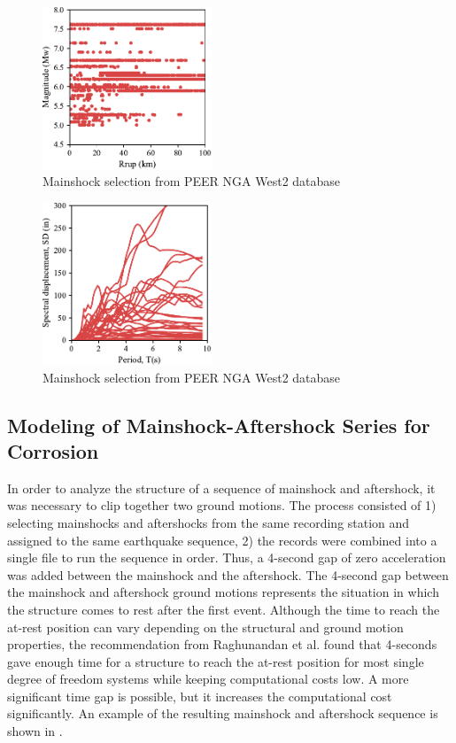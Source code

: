\begin{figure}[htbp]
	\centering
	\includegraphics[width=0.45\textwidth]{Chapter-5/figs/GM_Selection.pdf}
	\caption{Mainshock selection from PEER NGA West2 database}
	\label{fig:GM_Selection}
\end{figure}

\begin{figure}[htbp]
	\centering
	\includegraphics[width=0.45\textwidth]{Chapter-5/figs/SD_Spectrum_GM_Selection.pdf}
	\caption{Mainshock selection from PEER NGA West2 database}
	\label{fig:DisplacementSpectrum_Selection}
\end{figure}

\subsection{Modeling of Mainshock-Aftershock Series for Corrosion}

In order to analyze the structure of a sequence of mainshock and aftershock, it was necessary to clip together two ground motions. The process consisted of 1) selecting mainshocks and aftershocks from the same recording station and assigned to the same earthquake sequence, 2) the records were combined into a single file to run the sequence in order. Thus, a 4-second gap of zero acceleration was added between the mainshock and the aftershock. The 4-second gap between the mainshock and aftershock ground motions represents the situation in which the structure comes to rest after the first event. Although the time to reach the at-rest position can vary depending on the structural and ground motion properties, the recommendation from Raghunandan et al. \cite{Raghunandan2015} found that 4-seconds gave enough time for a structure to reach the at-rest position for most single degree of freedom systems while keeping computational costs low. A more significant time gap is possible, but it increases the computational cost significantly. An example of the resulting mainshock and aftershock sequence is shown in .

